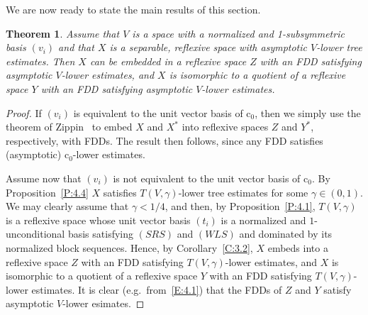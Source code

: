 \documentclass[11pt,leqno]{amsart}
\newtheorem{thm}{Theorem}[section]
\theoremstyle{definition}
\newcommand{\co}{\mathrm{c}_0}
\begin{document}
We are now ready to state the main results of this section.
\begin{thm}\label{T:4.5}
  Assume that $V$ is a space  with a normalized and 1-subsymmetric
  basis  $(v_i)$ and that $X$ is a separable, reflexive space with
  asymptotic $V$-lower tree estimates. Then $X$ can be embedded in a
  reflexive space $Z$ with an FDD satisfying asymptotic $V$-lower
  estimates, and $X$ is isomorphic to a quotient of a reflexive space
  $Y$ with an FDD satisfying  asymptotic  $V$-lower estimates.
\end{thm}
\begin{proof}
  If $(v_i)$ is equivalent to the unit vector basis of $\co$, then we
  simply use the theorem of Zippin~\cite{Z} to embed $X$ and $X^*$
  into reflexive spaces $Z$ and $Y^*$, respectively, with FDDs. The
  result then follows, since any FDD satisfies (asymptotic)
  $\co$-lower estimates.

  Assume now that $(v_i)$ is not equivalent to the unit vector basis
  of $\co$. By Proposition~\ref{P:4.4} $X$ satisfies
  $T(V,\gamma)$-lower tree estimates for some $\gamma\in (0,1)$. We
  may clearly assume that $\gamma<1/4$, and then, by
  Proposition~\ref{P:4.1}, $T(V,\gamma)$ is a reflexive space whose
  unit vector basis $(t_i)$ is a normalized and $1$-unconditional
  basis satisfying $(SRS)$ and $(WLS)$ and dominated by its normalized
  block sequences. Hence, by Corollary~\ref{C:3.2}, $X$ embeds into a
  reflexive space $Z$ with an FDD satisfying $T(V,\gamma)$-lower
  estimates, and $X$ is isomorphic to a quotient of a reflexive space
  $Y$ with an FDD satisfying $T(V,\gamma)$-lower estimates. It is
  clear (e.g.~from~\eqref{E:4.1}) that the FDDs of $Z$ and $Y$ satisfy
  asymptotic $V$-lower esimates.
\end{proof}
\end{document}
